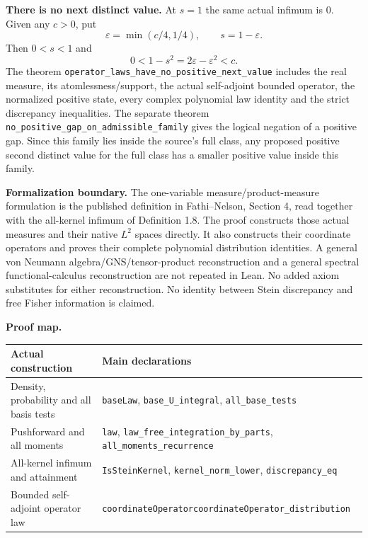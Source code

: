 \documentclass[11pt]{article}
\begin{document}
\newpage
\textbf{There is no next distinct value.}
At $s=1$ the same actual infimum is $0$. Given any $c>0$, put
\[
 \varepsilon=\min(c/4,1/4),\qquad s=1-\varepsilon.
\]
Then $0<s<1$ and
\[
 0<1-s^2=2\varepsilon-\varepsilon^2<c.
\]
The theorem \texttt{operator\_laws\_have\_no\_positive\_next\_value} includes
the real measure, its atomlessness/support, the actual self-adjoint bounded
operator, the normalized positive state, every complex polynomial law
identity and the strict discrepancy inequalities. The separate theorem
\texttt{no\_positive\_gap\_on\_admissible\_family} gives the logical
negation of a positive gap. Since this family lies inside the source's full
class, any proposed positive second distinct value for the full class has
a smaller positive value inside this family.

\textbf{Formalization boundary.}
The one-variable measure/product-measure formulation is the published
definition in Fathi--Nelson, Section 4, read together with the all-kernel
infimum of Definition 1.8. The proof constructs those actual measures and
their native $L^2$ spaces directly. It also constructs their coordinate
operators and proves their complete polynomial distribution identities.
A general von Neumann algebra/GNS/tensor-product reconstruction and a
general spectral functional-calculus reconstruction are not repeated in
Lean. No added axiom substitutes for either reconstruction. No identity
between Stein discrepancy and free Fisher information is claimed.

\textbf{Proof map.}
\begin{center}
\begin{tabular}{>{\raggedright\arraybackslash}p{.38\linewidth}>{\raggedright\arraybackslash}p{.55\linewidth}}
\toprule
Actual construction & Main declarations\\
\midrule
Density, probability and all basis tests &
 \texttt{baseLaw}, \texttt{base\_U\_integral}, \texttt{all\_base\_tests}\\
Pushforward and all moments &
 \texttt{law}, \texttt{law\_free\_integration\_by\_parts},
 \texttt{all\_moments\_recurrence}\\
All-kernel infimum and attainment &
 \texttt{IsSteinKernel}, \texttt{kernel\_norm\_lower},
 \texttt{discrepancy\_eq}\\
Bounded self-adjoint operator law &
 \texttt{coordinateOperator}\newline \texttt{coordinateOperator\_distribution}\\
\bottomrule
\end{tabular}
\end{center}
\end{document}
